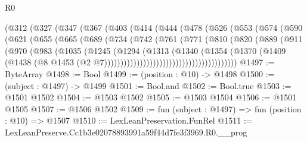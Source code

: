 \begin{lexlean}{R0}
\begin{coremodule}
            (@312
              (@327
                (@347
                  (@367
                    (@403
                      (@414
                        (@444
                          (@478
                            (@526
                              (@553
                                (@574
                                  (@590
                                    (@621
                                      (@655
                                        (@665
                                          (@689
                                            (@734
                                              (@742
                                                (@761
                                                  (@771
                                                    (@810
                                                      (@820
                                                        (@889
                                                          (@911
                                                            (@970
                                                              (@983
                                                                (@1035
                                                                  (@1245
                                                                    (@1294
                                                                      (@1313
                                                                        (@1340
                                                                          (@1354
                                                                            (@1370
                                                                              (@1409
                                                                                (@1438
                                                                                  (@8
                                                                                    @1453
                                                                                    (@2
                                                                                      @7)))))))))))))))))))))))))))))))))))))))))
@1497 := ByteArray
@1498 := Bool
@1499 := (position : @10) -> @1498
@1500 := (subject : @1497) -> @1499
@1501 := Bool.and
@1502 := Bool.true
@1503 := @1501 @1502
@1504 := @1503 @1502
@1505 := @1503 @1504
@1506 := @1501 @1505
@1507 := @1506 @1502
@1509 := fun (subject : @1497) => fun (position : @10) => @1507
@1510 := LexLeanPreservation.FunRel
@1511 := LexLeanPreserve.Cc1b3e02078893991a59f44d7fe3f3969.R0.__prog

\end{coremodule}
\end{lexlean}
